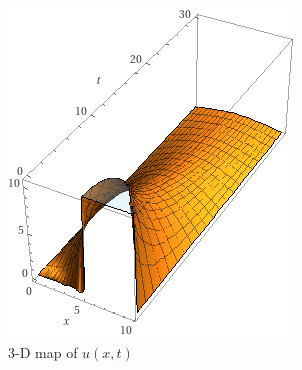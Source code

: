 \documentclass{article}
\numberwithin{equation}{section}
\begin{document}
\begin{figure}[!htb]
   \begin{minipage}{0.48\textwidth}
     \centering
     \includegraphics[width=.7\linewidth]{plot3.1.jpg}
     \caption{3-D map of $u(x,t)$}\label{Fig: 3.1}
   \end{minipage}\hfill
   \begin{minipage}{0.48\textwidth}
     \centering

\end{minipage}
\end{figure}
\end{document}
